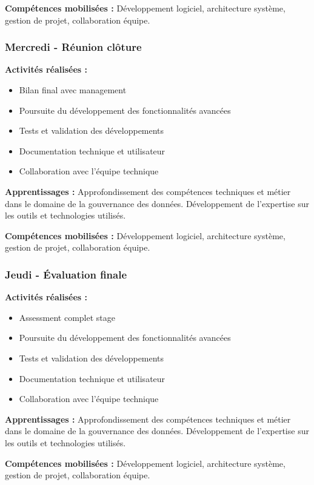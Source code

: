 \textbf{Compétences mobilisées :}
Développement logiciel, architecture système, gestion de projet, collaboration équipe.

\subsubsection{Mercredi - Réunion clôture}

\textbf{Activités réalisées :}
\begin{itemize}
    \item Bilan final avec management
    \item Poursuite du développement des fonctionnalités avancées
    \item Tests et validation des développements
    \item Documentation technique et utilisateur
    \item Collaboration avec l'équipe technique
\end{itemize}

\textbf{Apprentissages :}
Approfondissement des compétences techniques et métier dans le domaine de la gouvernance des données. Développement de l'expertise sur les outils et technologies utilisés.

\textbf{Compétences mobilisées :}
Développement logiciel, architecture système, gestion de projet, collaboration équipe.

\subsubsection{Jeudi - Évaluation finale}

\textbf{Activités réalisées :}
\begin{itemize}
    \item Assessment complet stage
    \item Poursuite du développement des fonctionnalités avancées
    \item Tests et validation des développements
    \item Documentation technique et utilisateur
    \item Collaboration avec l'équipe technique
\end{itemize}

\textbf{Apprentissages :}
Approfondissement des compétences techniques et métier dans le domaine de la gouvernance des données. Développement de l'expertise sur les outils et technologies utilisés.

\textbf{Compétences mobilisées :}
Développement logiciel, architecture système, gestion de projet, collaboration équipe.


